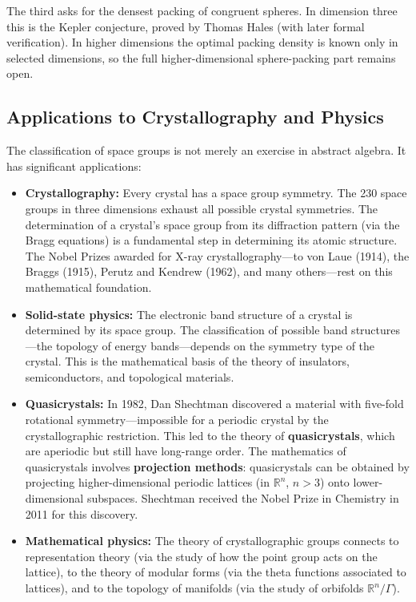 The third asks for the densest packing of congruent spheres. In dimension three this is the Kepler conjecture, proved by Thomas Hales (with later formal verification). In higher dimensions the optimal packing density is known only in selected dimensions, so the full higher-dimensional sphere-packing part remains open.

\subsection{Applications to Crystallography and Physics}

The classification of space groups is not merely an exercise in abstract algebra. It has significant applications:

\begin{itemize}
    \item \textbf{Crystallography:} Every crystal has a space group symmetry. The 230 space groups in three dimensions exhaust all possible crystal symmetries. The determination of a crystal's space group from its diffraction pattern (via the Bragg equations) is a fundamental step in determining its atomic structure. The Nobel Prizes awarded for X-ray crystallography---to von Laue (1914), the Braggs (1915), Perutz and Kendrew (1962), and many others---rest on this mathematical foundation.

    \item \textbf{Solid-state physics:} The electronic band structure of a crystal is determined by its space group. The classification of possible band structures---the topology of energy bands---depends on the symmetry type of the crystal. This is the mathematical basis of the theory of insulators, semiconductors, and topological materials.

    \item \textbf{Quasicrystals:} In 1982, Dan Shechtman discovered a material with five-fold rotational symmetry---impossible for a periodic crystal by the crystallographic restriction. This led to the theory of \textbf{quasicrystals}, which are aperiodic but still have long-range order. The mathematics of quasicrystals involves \textbf{projection methods}: quasicrystals can be obtained by projecting higher-dimensional periodic lattices (in $\mathbb{R}^n$, $n > 3$) onto lower-dimensional subspaces. Shechtman received the Nobel Prize in Chemistry in 2011 for this discovery.

    \item \textbf{Mathematical physics:} The theory of crystallographic groups connects to representation theory (via the study of how the point group acts on the lattice), to the theory of modular forms (via the theta functions associated to lattices), and to the topology of manifolds (via the study of orbifolds $\mathbb{R}^n / \Gamma$).
\end{itemize}

